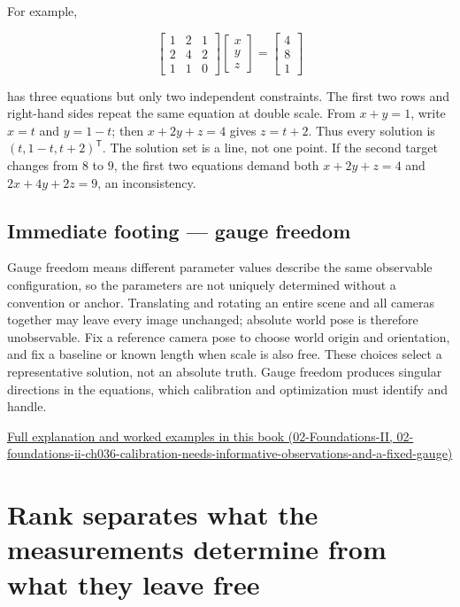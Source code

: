 For example,

\[
\begin{bmatrix}1&2&1\\2&4&2\\1&1&0\end{bmatrix}
\begin{bmatrix}x\\y\\z\end{bmatrix}
=\begin{bmatrix}4\\8\\1\end{bmatrix}
\]

has three equations but only two independent constraints. The first two rows and right-hand sides repeat the same equation at double scale. From \(x+y=1\), write \(x=t\) and \(y=1-t\); then \(x+2y+z=4\) gives \(z=t+2\). Thus every solution is \((t,1-t,t+2)^\mathsf T\). The solution set is a line, not one point. If the second target changes from \(8\) to \(9\), the first two equations demand both \(x+2y+z=4\) and \(2x+4y+2z=9\), an inconsistency.

\subsection{Immediate footing --- gauge freedom}\label{01-foundations-i-ch019-immediate-footing-gauge-freedom}

Gauge freedom means different parameter values describe the same observable configuration, so the parameters are not uniquely determined without a convention or anchor. Translating and rotating an entire scene and all cameras together may leave every image unchanged; absolute world pose is therefore unobservable. Fix a reference camera pose to choose world origin and orientation, and fix a baseline or known length when scale is also free. These choices select a representative solution, not an absolute truth. Gauge freedom produces singular directions in the equations, which calibration and optimization must identify and handle.

\href{../02-Foundations-II/main.pdf\#nameddest=02-foundations-ii-ch036-calibration-needs-informative-observations-and-a-fixed-gauge}{Full explanation and worked examples in this book (02-Foundations-II, 02-foundations-ii-ch036-calibration-needs-informative-observations-and-a-fixed-gauge)}

\section{Rank separates what the measurements determine from what they leave free}\label{01-foundations-i-ch019-rank-separates-what-the-measurements-determine-from-what-they-leave-free}

